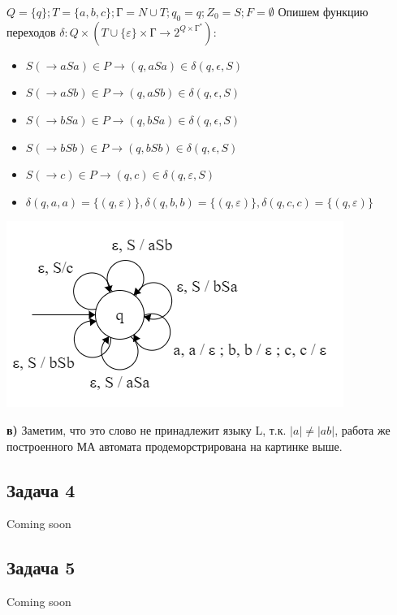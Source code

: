 \documentclass[a4paper,14pt]{article} %
\begin{document}
\newline
$Q = \{q\}; T = \{a, b, c\}; \text{Г} = N \cup T; q_0 = q; Z_0 = S; F = \emptyset$
\newline 
Опишем функцию переходов $\delta: Q \times (T \cup \{ \varepsilon \} \times \text{Г} \longrightarrow 2^{Q \times \text{Г}^*})$:
\begin{itemize}
    \item $S( \longrightarrow aSa) \in P \longrightarrow (q, aSa) \in \delta (q, \epsilon, S)$
    \item $S( \longrightarrow aSb) \in P \longrightarrow (q, aSb) \in \delta (q, \epsilon, S)$
    \item $S( \longrightarrow bSa) \in P \longrightarrow (q, bSa) \in \delta (q, \epsilon, S)$
    \item $S( \longrightarrow bSb) \in P \longrightarrow (q, bSb) \in \delta (q, \epsilon, S)$
    \item $S( \longrightarrow c) \in P \longrightarrow (q, c) \in \delta (q, \varepsilon, S)$
    \item $\delta (q, a, a) = \{(q, \varepsilon)\}, \delta (q, b, b) = \{(q, \varepsilon)\}, \delta (q, c, c) = \{(q, \varepsilon)\}$
\end{itemize}

\begin{center}
    \includegraphics{01.png}
\end{center}

\textbf{в)} Заметим, что это слово не принадлежит языку L, т.к. $|a| \neq |ab|$, работа же построенного МА автомата продеморстрирована на картинке выше.


\subsection{Задача 4}
Coming soon
\subsection{Задача 5}
Coming soon
\end{document}

